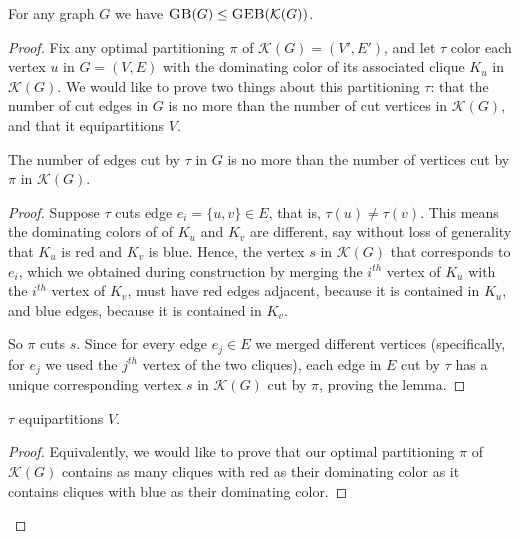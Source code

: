 \documentclass{article}
\newcommand{\sgeb}{\textsc{GEB} }
\newcommand{\sgb}{\textsc{GB} }
\begin{document}
	\begin{proposition}
		\label{gb-leq-geb}
		For any graph $G$ we have $\sgb(G) \leq \sgeb(\mathcal{K}(G))$.
	\end{proposition}
	\begin{proof}
		Fix any optimal partitioning $\pi$ of $\mathcal{K}(G) = (V', E')$, and
		let $\tau$ color each vertex $u$ in $G = (V, E)$ with the dominating
		color of its associated clique $K_u$ in $\mathcal{K}(G)$. We would
		like to
		prove two things about this partitioning $\tau$:
		that the number of cut edges in $G$ is no more than the number of
		cut vertices in $\mathcal{K}(G)$, and that it equipartitions $V$.


		\begin{lemma}
			\label{gb-leq-geb-lemma-1}
			The number of edges cut by $\tau$ in $G$ is no more than the number
			of vertices cut by $\pi$ in $\mathcal{K}(G)$.
		\end{lemma}
		\begin{proof}
			Suppose $\tau$ cuts edge $e_i = \{u, v\} \in E$, that is,
			$\tau(u) \neq \tau(v)$. This means the dominating colors of
			of $K_u$ and $K_v$ are different, say without loss of generality
			that $K_u$ is red and $K_v$ is blue. Hence, the vertex $s$ in
			$\mathcal{K}(G)$ that
			corresponds to $e_i$, which we obtained during construction
			by merging the $i^{th}$
			vertex of $K_u$ with the $i^{th}$ vertex of $K_v$, must have
			red edges adjacent, because it is contained in $K_u$, and blue
			edges, because it is contained in $K_v$.

			So $\pi$ cuts $s$.
			Since for every edge $e_j \in E$ we merged different
			vertices (specifically, for $e_j$ we used the $j^{th}$ vertex of
			the two cliques), each edge in $E$ cut by $\tau$ has a unique
			corresponding vertex $s$ in $\mathcal{K}(G)$ cut by $\pi$,
			proving the lemma.
		\end{proof}
		\begin{lemma}
			\label{gb-leq-geb-lemma-2}
			$\tau$ equipartitions $V$.
		\end{lemma}
		\begin{proof}
			Equivalently, we would like to prove that our optimal partitioning
			$\pi$ of $\mathcal{K}(G)$ contains as many cliques with red as
			their dominating color as it contains cliques with blue as their
			dominating color.


\end{proof}
\end{proof}
\end{document}
